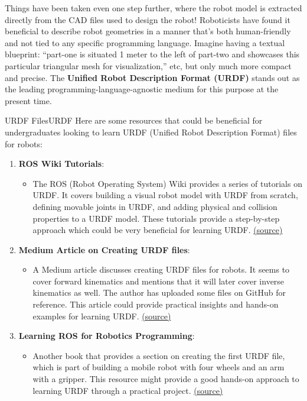 Things have been taken even one step further, where the robot model is extracted directly from the CAD files used to design the robot! Roboticists have found it beneficial to describe robot geometries in a manner that's both human-friendly and not tied to any specific programming language. Imagine having a textual blueprint: ``part-one is situated 1 meter to the left of part-two and showcases this particular triangular mesh for visualization,'' etc, but only much more compact and precise. The \textbf{Unified Robot Description Format (URDF)} stands out as the leading programming-language-agnostic medium for this purpose at the present time. 

\begin{funColor}{URDF Files}{URDF}
    Here are some resources that could be beneficial for undergraduates looking to learn URDF (Unified Robot Description Format) files for robots:

\begin{enumerate}
    \item \textbf{ROS Wiki Tutorials}:
    \begin{itemize}
        \item The ROS (Robot Operating System) Wiki provides a series of tutorials on URDF. It covers building a visual robot model with URDF from scratch, defining movable joints in URDF, and adding physical and collision properties to a URDF model. These tutorials provide a step-by-step approach which could be very beneficial for learning URDF. \href{http://wiki.ros.org/urdf/Tutorials}{(source)}
    \end{itemize}

    \item \textbf{Medium Article on Creating URDF files}:
    \begin{itemize}
        \item A Medium article discusses creating URDF files for robots. It seems to cover forward kinematics and mentions that it will later cover inverse kinematics as well. The author has uploaded some files on GitHub for reference. This article could provide practical insights and hands-on examples for learning URDF. \href{https://medium.com/@...}{(source)} %
    \end{itemize}

   
    \item \textbf{Learning ROS for Robotics Programming}:
    \begin{itemize}
        \item Another book that provides a section on creating the first URDF file, which is part of building a mobile robot with four wheels and an arm with a gripper. This resource might provide a good hands-on approach to learning URDF through a practical project. \href{https://subscription.packtpub.com/book/hardware_and_creative/9781783554713/1/ch01lvl1sec12/creating-our-first-urdf-file}{(source)}
    \end{itemize}
\end{enumerate}
\end{funColor}



